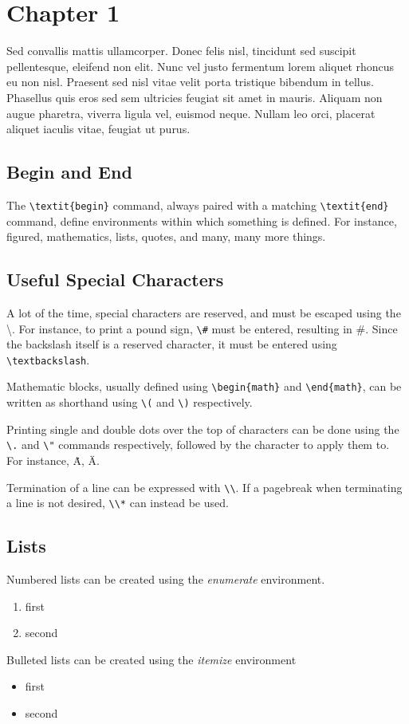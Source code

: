 \section{Chapter 1}

Sed convallis mattis ullamcorper. Donec felis nisl, tincidunt sed suscipit pellentesque, eleifend non elit. Nunc vel justo fermentum lorem aliquet rhoncus eu non nisl. Praesent sed nisl vitae velit porta tristique bibendum in tellus. Phasellus quis eros sed sem ultricies feugiat sit amet in mauris. Aliquam non augue pharetra, viverra ligula vel, euismod neque. Nullam leo orci, placerat aliquet iaculis vitae, feugiat ut purus.

\subsection{Begin and End}
The \verb;\textit{begin}; command, always paired with a matching \verb;\textit{end}; command, define environments within which something is defined.  For instance, figured, mathematics, lists, quotes, and many, many more things.

\subsection{Useful Special Characters}
A lot of the time, special characters are reserved, and must be escaped using the \textbackslash.  For instance, to print a pound sign, \verb;\#; must be entered, resulting in \#.  Since the backslash itself is a reserved character, it must be entered using \verb;\textbackslash;.

Mathematic blocks, usually defined using \verb;\begin{math}; and \verb;\end{math};, can be written as shorthand using \verb;\(; and \verb;\); respectively.

Printing single and double dots over the top of characters can be done using the \verb;\.; and \verb;\"; commands respectively, followed by the character to apply them to.  For instance, \.A, \"A.

Termination of a line can be expressed with \verb;\\;.  If a pagebreak when terminating a line is not desired, \verb;\\*; can instead be used.

\subsection{Lists}
Numbered lists can be created using the \textit{enumerate} environment.
\begin{enumerate}
	\item first
	\item second
\end{enumerate}
Bulleted lists can be created using the \textit{itemize} environment
\begin{itemize}
	\item first
	\item second
\end{itemize}


